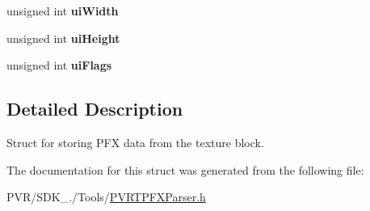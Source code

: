 \begin{DoxyCompactItemize}
\item 
\hypertarget{struct_s_p_v_r_t_p_f_x_parser_texture_aa7b92549cc002f660f7605e619ea85fc}{unsigned int {\bfseries ui\+Width}}\label{struct_s_p_v_r_t_p_f_x_parser_texture_aa7b92549cc002f660f7605e619ea85fc}

\item 
\hypertarget{struct_s_p_v_r_t_p_f_x_parser_texture_aee8bd246a6a13a33629adb0417f472c9}{unsigned int {\bfseries ui\+Height}}\label{struct_s_p_v_r_t_p_f_x_parser_texture_aee8bd246a6a13a33629adb0417f472c9}

\item 
\hypertarget{struct_s_p_v_r_t_p_f_x_parser_texture_a042bdedf92da4a407cd71a3042796d62}{unsigned int {\bfseries ui\+Flags}}\label{struct_s_p_v_r_t_p_f_x_parser_texture_a042bdedf92da4a407cd71a3042796d62}

\end{DoxyCompactItemize}


\subsection{Detailed Description}
Struct for storing P\+F\+X data from the texture block. 



 

The documentation for this struct was generated from the following file\+:\begin{DoxyCompactItemize}
\item 
P\+V\+R/\+S\+D\+K\+\_./\+Tools/\hyperlink{_p_v_r_t_p_f_x_parser_8h}{P\+V\+R\+T\+P\+F\+X\+Parser.\+h}\end{DoxyCompactItemize}
